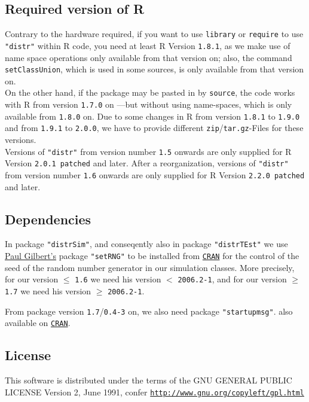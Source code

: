 \documentclass[11pt]{article}
\newcommand{\code}[1]{{\tt #1}}
\newcommand{\pkg}[1]{{\tt "#1"}}
\begin{document}
\subsection{Required version of {\sf R}}
Contrary to the hardware required,
if you want to use \code{library} or \code{require} to use  \pkg{distr} within {\sf R} code,
you need at least {\sf R} Version {\tt 1.8.1},
as we make use of name space operations only available from that version on;
also, the command \code{setClassUnion}, which is used in some sources, is only available from that version on.\\
%
On the other hand, if the package may be pasted in by \code{source}, the code works with {\sf R} from
version {\tt 1.7.0} on ---but without using name-spaces, which is only available from {\tt 1.8.0} on.
Due to some changes in {\sf R} from version {\tt 1.8.1} to {\tt 1.9.0} and from {\tt 1.9.1} to {\tt 2.0.0}, we have to provide different
{\tt zip}/{\tt tar.gz}-Files for these versions.\\
Versions of \pkg{distr} from version number {\tt 1.5} onwards are only
supplied for {\sf R} Version {\tt 2.0.1 patched} and later.
After a reorganization, versions of \pkg{distr} from version number {\tt 1.6} onwards are only
supplied for {\sf R} Version {\tt 2.2.0 patched} and later.


\subsection{Dependencies}
In package \pkg{distrSim}, and conseqently also in package \pkg{distrTEst} we use
\href{mailto:pgilbert@bank-banque-canada.ca}{Paul Gilbert's}  package \pkg{setRNG}
to be installed from \href{http://cran.r-project.org/mirrors.html}{\tt CRAN}
for the control of the seed of the random number generator in our simulation classes.
More precisely, for our version $\le$ {\tt 1.6}  we need his version $<$ {\tt 2006.2-1},
and for our version $\ge$ {\tt 1.7} we need his version $\ge$ {\tt 2006.2-1}.

From package version {\tt 1.7}/{\tt 0.4-3} on, we also need package \pkg{startupmsg}.
also available on \href{http://cran.r-project.org/mirrors.html}{\tt CRAN}.

\subsection{License}
This software is distributed under the terms of the GNU GENERAL
PUBLIC LICENSE Version 2, June 1991, confer\newline
\href{http://www.gnu.org/copyleft/gpl.html}{\footnotesize \tt http://www.gnu.org/copyleft/gpl.html}
\end{document}
